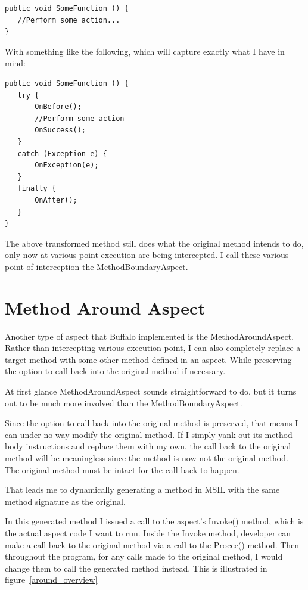 \begin{lstlisting}[caption={Sample function}, label=samplefunction]
public void SomeFunction () {
   //Perform some action...
}
\end{lstlisting}

With something like the following, which will capture exactly what I have in mind:

\begin{lstlisting}[caption={Sample try-cath-finally}, label=sampletcf]
public void SomeFunction () {
   try {
       OnBefore();
       //Perform some action
       OnSuccess();
   }
   catch (Exception e) {
       OnException(e);
   }
   finally {
       OnAfter();
   }
}
\end{lstlisting}

The above transformed method still does what the original method intends to do, only now at various point execution are being intercepted. I call these various point of interception the MethodBoundaryAspect.

\section{Method Around Aspect}
Another type of aspect that Buffalo implemented is the MethodAroundAspect. Rather than intercepting various execution point, I can also completely replace a target method with some other method defined in an aspect. While preserving the option to call back into the original method if necessary.

At first glance MethodAroundAspect sounds straightforward to do, but it turns out to be much more involved than the MethodBoundaryAspect.

Since the option to call back into the original method is preserved, that means I can under no way modify the original method. If I simply yank out its method body instructions and replace them with my own, the call back to the original method will be meaningless since the method is now not the original method. The original method must be intact for the call back to happen.

That leads me to dynamically generating a method in MSIL with the same method signature as the original.

In this generated method I issued a call to the aspect’s Invoke() method, which is the actual aspect code I want to run. Inside the Invoke method, developer can make a call back to the original method via a call to the Procee() method. Then throughout the program, for any calls made to the original method, I would change them to call the generated method instead. This is illustrated in figure~\ref{around_overview}

